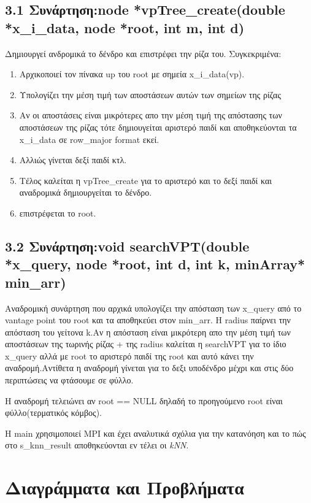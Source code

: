 \documentclass[10pt]{report}
\begin{document}
\subsection{3.1 Συνάρτηση:node *vpTree\_create(double *x\_i\_data, node *root, int m, int d)}

Δημιουργεί ανδρομικά το δένδρο και επιστρέφει την ρίζα του.
Συγκεκριμένα:
\begin{enumerate}
\item Αρχικοποιεί τον πίνακα up του root με σημεία x\_i\_data(vp).
\item Υπολογίζει την μέση τιμή των αποστάσεων αυτών των σημείων της ρίζας
\item Aν οι αποστάσεις είναι μικρότερες απο την μέση τιμή της απόστασης των αποστάσεων της ρίζας τότε δημιουγείται αριστερό παιδί και αποθηκεύονται τα x\_i\_data σε row\_major format εκεί.
\item Aλλιώς γίνεται δεξί παιδί κτλ.
\item Τέλος καλείται η vpTree\_create για το αριστερό και το δεξί παιδί και αναδρομικά δημιουργείται το δένδρο.
\item επιστρέφεται το root.

\end{enumerate}

\subsection{3.2 Συνάρτηση:void searchVPT(double *x\_query, node *root, int d, int k, minArray* min\_arr)}
Αναδρομική συνάρτηση που αρχικά υπολογίζει την απόσταση των  x\_query από το vantage point του root και τα αποθηκεύει στον min\_arr.
Η radius παίρνει την απόσταση του γείτονα  k.Αν η απόσταση είναι μικρότερη απο την μέση τιμή των αποστάσεων της τωρινής ρίζας + της radius καλείται η searchVPT για το ίδιο x\_query αλλά με root το αριστερό παιδί της root και αυτό κάνει την αναδρομή.Αντίθετα η αναδρομή γίνεται για το δεξι υποδένδρο μέχρι και στις δύο περιπτώσεις να φτάσουμε σε φύλλο.

Η αναδρομή τελειώνει αν root == NULL δηλαδή το προηγούμενο root είναι φύλλο(τερματικός κόμβος). 

Η main χρησιμοποιεί MPI και έχει αναλυτικά σχόλια για την κατανόηση και το πώς στο s\_knn\_result αποθηκεύονται εν τέλει οι \emph{kNN}.


\section{Διαγράμματα και Προβλήματα}
\end{document}
